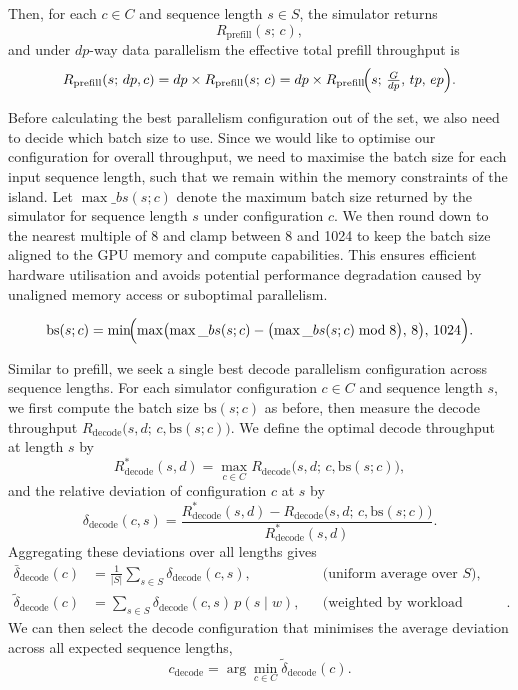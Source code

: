 Then, for each \(c\in C\) and sequence length \(s\in S\), the simulator returns
\[
R_{\mathrm{prefill}}(s;\,c),
\]
and under \(dp\)-way data parallelism the effective total prefill throughput is
\[
R_{\mathrm{prefill}}(s;\,dp,c)
= dp \times R_{\mathrm{prefill}}(s;\,c)
= dp \times R_{\mathrm{prefill}}\!\Bigl(s;\,\tfrac{G}{dp},\,tp,\,ep\Bigr).
\]

Before calculating the best parallelism configuration out of the set, we also need to decide which batch size to use.
Since we would like to optimise our configuration for overall throughput, we need to maximise the batch size for each input sequence length, such that we remain within the memory constraints of the island.
Let \(\max\_bs(s; c)\) denote the maximum batch size returned by the simulator for sequence length \(s\) under configuration \(c\).
We then round down to the nearest multiple of 8 and clamp between 8 and 1024 to keep the batch size aligned to the GPU memory and compute capabilities.
This ensures efficient hardware utilisation and avoids potential performance degradation caused by unaligned memory access or suboptimal parallelism. %


\[
\mathrm{bs}(s;c)
= \min\!\Bigl(\max\bigl(\max\_bs(s;c) - \bigl(\max\_bs(s;c) \bmod 8\bigr),\,8\bigr),\,1024\Bigr).
\]

Similar to prefill, we seek a single best decode parallelism configuration across sequence lengths. 
For each simulator configuration \(c\in C\) and sequence length \(s\), we first compute the batch size \(\mathrm{bs}(s;c)\) as before, then measure the decode throughput $R_{\mathrm{decode}}\bigl(s, d;\,c, \mathrm{bs}(s;c)\bigr)$.
We define the optimal decode throughput at length \(s\) by
\[
R_{\mathrm{decode}}^*(s,d) = \max_{c\in C} R_{\mathrm{decode}}\bigl(s, d;\,c, \mathrm{bs}(s;c)\bigr),
\]
and the relative deviation of configuration \(c\) at \(s\) by
\[
\delta_{\mathrm{decode}}(c,s) = \frac{R_{\mathrm{decode}}^*(s,d) - R_{\mathrm{decode}}\bigl(s, d;\,c, \mathrm{bs}(s;c)\bigr)}{R_{\mathrm{decode}}^*(s,d)}.
\]
Aggregating these deviations over all lengths gives
\[
\begin{aligned}
\bar{\delta}_{\mathrm{decode}}(c) &= \frac{1}{\lvert S\rvert} \sum_{s\in S} \delta_{\mathrm{decode}}(c,s), 
&&\text{(uniform average over \(S\))},\\
\widetilde{\delta}_{\mathrm{decode}}(c) &= \sum_{s\in S} \delta_{\mathrm{decode}}(c,s)\,p(s\mid w),
&&\text{(weighted by workload distribution)}.
\end{aligned}
\]
We can then select the decode configuration that minimises the average deviation across all expected sequence lengths,
\[
c_{\mathrm{decode}} = \arg\min_{c\in C}\widetilde{\delta}_{\mathrm{decode}}(c).
\]

